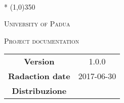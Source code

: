 \documentclass[a4paper,12pt]{article}
\date{2017-05-10}
\begin{document}
	\begin{titlepage}
		\centering
		{\huge\bfseries \nomeprogetto\par}
		\sottotitolo \\*
		\line(1,0){350} \\
		{\scshape\LARGE University of Padua \par}
		\vspace{1cm}
		{\scshape\Large Project documentation \par}
		\logo
		\newpage
		\begin{tabular}{c|c}
			{\hfill \textbf{Version}} 			& 1.0.0						\\ 
			{\hfill\textbf{Radaction date}} 	& 2017-06-30 		\\ 
			{\hfill\textbf{Distribuzione}} 		& \abujari \\
		\end{tabular}
	\end{titlepage}
	
	\pagestyle{myfront}
	\newpage
	\tableofcontents
	\newpage
	\listoftables
	\newpage
	\listoffigures
	
	\label{LastFrontPage}	
	\newpage	
	\pagestyle{mymain}
				
%		
%			
%		
		
	\label{LastPage}
\end{document}
